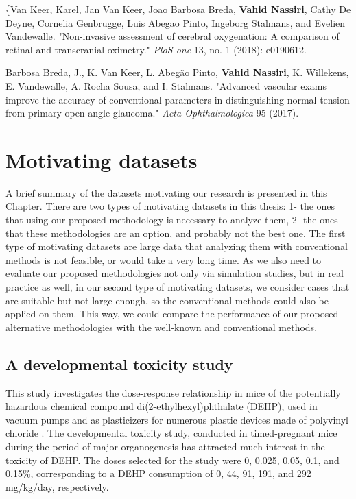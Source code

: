 \documentclass[11pt,a5paper,twoside]{book}
\begin{document}
\begin{enumerate}
{	\item \{Van Keer, Karel, Jan Van Keer, Joao Barbosa Breda, \textbf{Vahid Nassiri}, Cathy De Deyne, Cornelia Genbrugge, Luis Abegao Pinto, Ingeborg Stalmans, and Evelien Vandewalle. "Non-invasive assessment of cerebral oxygenation: A comparison of retinal and transcranial oximetry." \textit{PloS one} 13, no. 1 (2018): e0190612.}

	\item {Barbosa Breda, J., K. Van Keer, L. Abegão Pinto, \textbf{Vahid Nassiri}, K. Willekens, E. Vandewalle, A. Rocha Sousa, and I. Stalmans. "Advanced vascular exams improve the accuracy of conventional parameters in distinguishing normal tension from primary open angle glaucoma." \textit{Acta Ophthalmologica} 95 (2017).}

\end{enumerate}




\chapter{Motivating datasets}
\label{sec_data_sets}

A brief summary of the datasets motivating our research is presented in this Chapter. There are two types of motivating datasets in this thesis: 1- the ones that using our proposed methodology is necessary to analyze them, 2- the ones that these methodologies are an option, and probably not the best one. The first type of motivating datasets are large data that analyzing them with conventional methods is not feasible, or would take a very long time. As we also need to evaluate our proposed methodologies not only via simulation studies, but in real practice as well, in our second type of motivating datasets, we consider cases that are suitable but not large enough, so the conventional methods could also be applied on them. This way, we could compare the performance of our proposed alternative methodologies with the well-known and conventional methods.


\section{A developmental toxicity study} 
\label{motive_tox}
This study investigates the dose-response
relationship in mice of the potentially hazardous chemical compound di(2-ethylhexyl)phthalate
(DEHP), used in vacuum pumps and as plasticizers for numerous plastic devices made of polyvinyl chloride \citep{tyl1988}. The developmental toxicity study, conducted in timed-pregnant
mice during the period of major organogenesis has attracted
much interest in the toxicity of DEHP. The doses selected for the study were 0, 0.025, 0.05, 0.1,
and 0.15\%, corresponding to a DEHP consumption of 0, 44, 91, 191, and 292 mg/kg/day, respectively.
\end{document}
